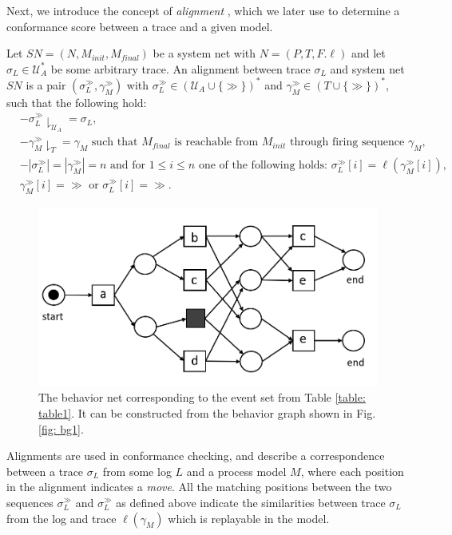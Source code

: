 Next, we introduce the concept of \textit{alignment} \cite{alignment}, which we later use to determine a conformance score between a trace and a given model.
\begin{definition}[Alignment]
Let $SN=(N,M_{init},M_{final})$ be a system net with $N=(P,T,F.\ell)$ 
and let $\sigma_L \in \mathcal{U}_A^*$ be some arbitrary trace.
An alignment between trace $\sigma_L$ and system net $SN$ is a pair $(\sigma_L^{\gg},\gamma_M^{\gg})$ with $\sigma_L^{\gg} \in (\mathcal{U}_A \cup \{\gg\})^*$ and $\gamma_M^{\gg} \in (T \cup \{\gg\})^*$, such that the following hold:
\begin{align*}
&-\sigma_L^{\gg} \downharpoonright_{\mathcal{U}_A} = \sigma_L,\\
&-\gamma_M^{\gg} \downharpoonright_T = \gamma_M \text{ such that }M_{final} \text{ is reachable from } M_{init} \text{ through firing sequence } \gamma_M,\\
&-|\sigma_L^{\gg}| = |\gamma_M^{\gg}| = n \text{ and for } 1 \leq i \leq n \text{ one of the following holds: }
\sigma_L^{\gg}[i] = \ell(\gamma_M^{\gg}[i]), \\
&\gamma_M^{\gg}[i] = \gg \text{ or }   \sigma_L^{\gg}[i] = \gg.
\end{align*}
\end{definition}
%
%
%
%
\begin{figure}[h!]
	\centering
	\includegraphics[width=0.8 \columnwidth]{figures/bn1.png}
	\caption{The behavior net corresponding to the event set from Table \ref{table: table1}. It can be constructed from the behavior graph shown in Fig. \ref{fig: bg1}.}
	\label{fig: bn1}
\end{figure}
%
%
%
%
%
\pagebreak
Alignments are used in conformance checking, and describe a correspondence between a trace $\sigma_L$ from some log $L$ and a process model $M$, where each position in the alignment indicates a \textit{move}.
All the matching positions between the two sequences $\sigma_L^{\gg}$ and $\sigma_L^{\gg}$ as defined above indicate the similarities between trace $\sigma_L$ from the log and trace $\ell(\gamma_M)$ which is replayable in the model.
